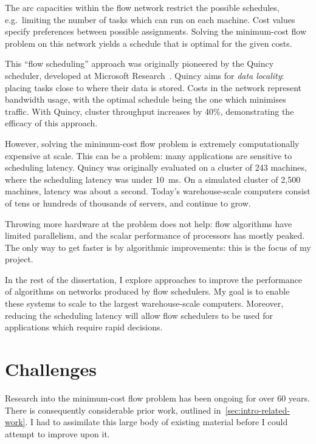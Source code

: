 
The arc capacities within the flow network restrict the possible schedules, e.g.\ limiting the number of tasks which can run on each machine. Cost values specify preferences between possible assignments. Solving the minimum-cost flow problem on this network yields a schedule that is optimal for the given costs.

This ``flow scheduling'' approach was originally pioneered by the Quincy scheduler, developed at Microsoft Research~\cite{Isard:2009}. Quincy aims for \emph{data locality}: placing tasks close to where their data is stored. Costs in the network represent bandwidth usage, with the optimal schedule being the one which minimises traffic. With Quincy, cluster throughput increases by 40\%, demonstrating the efficacy of this approach.

However, solving the minimum-cost flow problem is extremely computationally expensive at scale. This can be a problem: many applications are sensitive to scheduling latency. Quincy was originally evaluated on a cluster of 243 machines, where the scheduling latency was under \SI{10}{\milli\second}. On a simulated cluster of 2,500 machines, latency was about a second. Today's warehouse-scale computers consist of tens or hundreds of thousands of servers, and continue to grow.

Throwing more hardware at the problem does not help: flow algorithms have limited parallelism, and the scalar performance of processors has mostly peaked. The only way to get faster is by algorithmic improvements: this is the focus of my project.

In the rest of the dissertation, I explore approaches to improve the performance of algorithms on networks produced by flow schedulers. My goal is to enable these systems to scale to the largest warehouse-scale computers. Moreover, reducing the scheduling latency will allow flow schedulers to be used for applications which require rapid decisions.

\section{Challenges} \label{sec:intro-challenges}

Research into the minimum-cost flow problem has been ongoing for over 60 years. There is consequently considerable prior work, outlined in~\cref{sec:intro-related-work}. I had to assimilate this large body of existing material before I could attempt to improve upon it.

